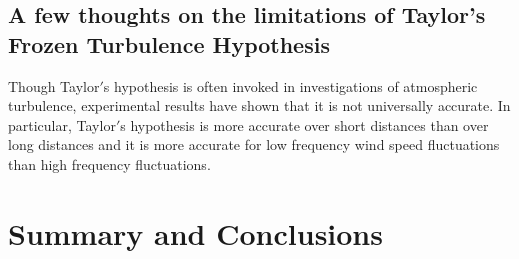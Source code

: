 \subsection{A few thoughts on the limitations of Taylor's Frozen Turbulence Hypothesis}
Though Taylor$'$s hypothesis is often invoked in investigations of atmospheric turbulence, experimental results have shown that it is not universally accurate.  In particular, Taylor$'$s hypothesis is more accurate over short distances than over long distances and it is more accurate for low frequency wind speed fluctuations than high frequency fluctuations. \cite{higgins2012, schlipf2010}


\section{Summary and Conclusions} \label{section2-5}
